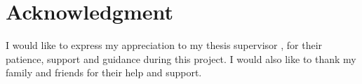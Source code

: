 \thispagestyle{empty}
\section*{Acknowledgment}

I would like to express my appreciation to my thesis supervisor \mySupervisor, for their patience, support and guidance during this project. I would also like to thank my family and friends for their help and support.

\newpage
\thispagestyle{empty}
\mbox{}
\newpage